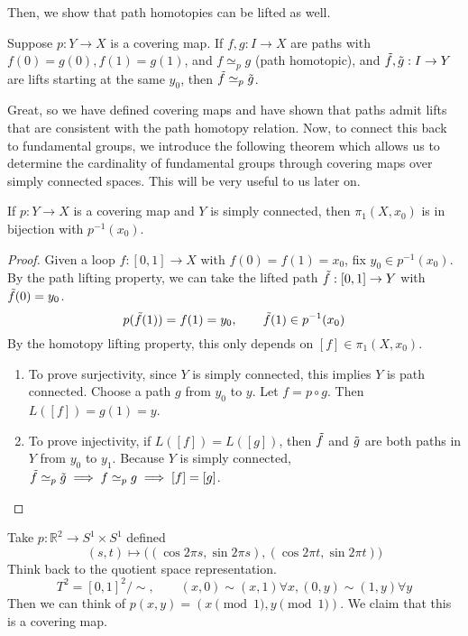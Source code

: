   Then, we show that path homotopies can be lifted as well. 

  \begin{lemma}
    Suppose $p: Y \to X$ is a covering map. If $f, g: I \to X$ are paths with $f(0) = g(0), f(1) = g(1)$, and $f \simeq_p g$ (path homotopic), and $\Tilde{f}, \Tilde{g}: I \to Y$ are lifts starting at the same $y_0$, then $\Tilde{f} \simeq_p \Tilde{g}$. 
  \end{lemma}

  Great, so we have defined covering maps and have shown that paths admit lifts that are consistent with the path homotopy relation. Now, to connect this back to fundamental groups, we introduce the following theorem which allows us to determine the cardinality of fundamental groups through covering maps over simply connected spaces. This will be very useful to us later on.  

  \begin{theorem}
    If $p: Y \to X$ is a covering map and $Y$ is simply connected, then $\pi_1 (X, x_0)$ is in bijection with $p^{-1}(x_0)$. 
  \end{theorem} 
  \begin{proof}
    Given a loop $f: [0, 1] \to X$ with $f(0) = f(1) = x_0$, fix $y_0 \in p^{-1} (x_0)$. By the path lifting property, we can take the lifted path $\Tilde{f}: [0, 1] \to Y$ with $\Tilde{f}(0) = y_0$. 
    \begin{equation}
      p(\Tilde{f}(1)) = f(1) = y_0, \qquad \Tilde{f}(1) \in p^{-1} (x_0)
    \end{equation}
    By the homotopy lifting property, this only depends on $[f] \in \pi_1 (X, x_0)$. 
    \begin{enumerate}
      \item To prove surjectivity, since $Y$ is simply connected, this implies $Y$ is path connected. Choose a path $g$ from $y_0$ to $y$. Let $f = p \circ g$. Then $L([f]) = g(1) = y$. 

      \item To prove injectivity, if $L ([f]) = L([g])$, then $\Tilde{f}$ and $\Tilde{g}$ are both paths in $Y$ from $y_0$ to $y_1$. Because $Y$ is simply connected, $\Tilde{f} \simeq_p \Tilde{g} \implies f \simeq_p g \implies [f] = [g]$. 
    \end{enumerate}
  \end{proof}

  \begin{example}
    Take $p: \mathbb{R}^2 \to S^1 \times S^1$ defined 
    \begin{equation}
      (s, t) \mapsto \big( (\cos{2 \pi s}, \sin{2 \pi s}), (\cos{2 \pi t}, \sin{2 \pi t}) \big)
    \end{equation}
    Think back to the quotient space representation. 
    \begin{equation}
      T^2 = [0, 1]^2 /{\sim}, \qquad (x, 0) \sim (x, 1) \forall x, (0, y) \sim (1, y) \forall y
    \end{equation}
    Then we can think of $p(x, y) = (x \pmod{1}, y \pmod{1})$. We claim that this is a covering map. 
  \end{example}

